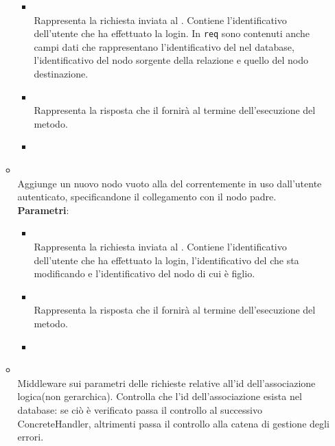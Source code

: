 \begin{itemize}
\begin{itemize}
\begin{itemize}
\item {}
\\ Rappresenta la richiesta inviata al . Contiene l’identificativo dell’utente che ha effettuato la login. In \texttt{req} sono contenuti anche campi dati che rappresentano l’identificativo del  nel database, l’identificativo del nodo sorgente della relazione e quello del nodo destinazione.
\item {}
\\ Rappresenta la risposta che il  fornirà al termine dell’esecuzione del metodo.
\item {}
\\ \dpNext
\end{itemize}
\item {}
\\ Aggiunge un nuovo nodo vuoto alla  del  correntemente in uso dall’utente autenticato, specificandone il collegamento con il nodo padre.
\\ \textbf{Parametri}:
\begin{itemize}
\item {}
\\ Rappresenta la richiesta inviata al . Contiene l’identificativo dell’utente che ha effettuato la login, l’identificativo del  che sta modificando e l’identificativo del nodo di cui è figlio.
\item {}
\\ Rappresenta la risposta che il  fornirà al termine dell’esecuzione del metodo.
\item {}
\\ \dpNext
\end{itemize}
\item {}
\\ Middleware sui parametri delle richieste  relative all'id dell'associazione logica(non gerarchica). Controlla che l'id dell'associazione esista nel database: se ciò è verificato passa il controllo al successivo ConcreteHandler, altrimenti passa il controllo alla catena di gestione degli errori.

\end{itemize}
\end{itemize}
